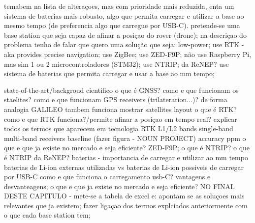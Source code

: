     temabem na lista de alteraçoes, mas com prioridade mais reduzida, enta um sistema de baterias mais robusto, algo que permita carregar e utilizar a base ao mesmo tempo (de preferencia algo que carregue por USB-C).
    pretende-se uma base station que seja capaz de afinar a posiçao do rover (drone);
    na descriçao do problema tenho de falar que quero uma solução que seja:
        low-power;
        use RTK - aka provides precise navigation;
        use ZigBee;
        use ZED-F9P;
        não use Raspberry Pi, mas sim 1 ou 2 microcontroladores (STM32);
        use NTRIP;
            da ReNEP?
        use sistema de baterias que permita carregar e usar a base ao mm tempo;

state-of-the-art/backgroud cientifico
    o que é GNSS? %
        como e que funcionam os staelites?
        como e que funcionam GPS receivers (trilateration...)?
            de forma analogia GALILEO tambem funciona
            mostrar satellites layout
    o que é RTK?  %
        como e que RTK funciona?/permite afinar a posiçao em tempo real?
        explicar todos os termos que aparecem em tecnologia RTK
            L1/L2 bands
            single-band multi-band receivers
            baseline (fazer figura - NOUN PROJECT)
            accuracy
            ppm
        o que e que ja existe no mercado e seja eficiente?
        ZED-F9P;
    o que é NTRIP?
        o que é NTRIP da ReNEP?
    baterias - importancia de carregar e utilizar ao mm tempo
        baterias de Li-ion externas utilizadas vs baterias de Li-ion possiveis de carregar por USB-C
            como e que funciona o carregamento usb-C?
            vantagens e desvanteagens;
            o que e que ja existe no mercado e seja eficiente?
    NO FINAL DESTE CAPITULO - mete-se a tabela de excel e:
        apontam se as soluçoes mais relevantes que ja existem;
        fazer ligaçao dos termos explciados anteriormente com o que cada base station tem;

    
